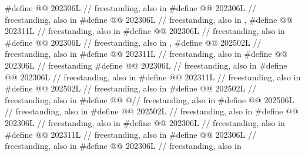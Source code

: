 \begin{codeblock}
#define @@          202306L // freestanding, also in 
#define @@             202306L // freestanding, also in 
#define @@              202306L // freestanding, also in , 
#define @@              202311L // freestanding, also in 
#define @@               202306L // freestanding, also in 
#define @@                 202306L
  // freestanding, also in , 
#define @@            202502L // freestanding, also in 
#define @@             202311L // freestanding, also in 
#define @@  202306L // freestanding
#define @@           202306L // freestanding, also in 
#define @@             202306L // freestanding, also in 
#define @@               202311L // freestanding, also in 
#define @@               202502L // freestanding, also in 
#define @@              202502L // freestanding, also in 
#define @@         @\seebelow@ // freestanding, also in 
#define @@             202506L // freestanding, also in 
#define @@               202502L // freestanding, also in 
#define @@               202306L // freestanding, also in 
#define @@                202306L // freestanding, also in 
#define @@          202311L // freestanding, also in 
#define @@                202306L // freestanding, also in 
#define @@              202306L // freestanding, also in 

\end{codeblock}
